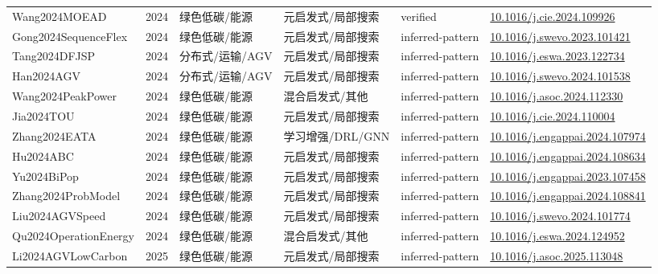 \documentclass[UTF8,a4paper,11pt]{ctexart}
\begin{document}
\begin{landscape}
\begin{longtable}{>{\raggedright\arraybackslash}p{5.0cm}p{0.8cm}>{\raggedright\arraybackslash}p{2.6cm}>{\raggedright\arraybackslash}p{2.8cm}>{\raggedright\arraybackslash}p{2.6cm}>{\raggedright\arraybackslash}p{5.4cm}}
Wang2024MOEAD & 2024 & 绿色低碳/能源 & 元启发式/局部搜索 & verified & \href{https://doi.org/10.1016/j.cie.2024.109926}{10.1016/j.cie.2024.109926} \\
Gong2024SequenceFlex & 2024 & 绿色低碳/能源 & 元启发式/局部搜索 & inferred-pattern & \href{https://doi.org/10.1016/j.swevo.2023.101421}{10.1016/j.swevo.2023.101421} \\
Tang2024DFJSP & 2024 & 分布式/运输/AGV & 元启发式/局部搜索 & inferred-pattern & \href{https://doi.org/10.1016/j.eswa.2023.122734}{10.1016/j.eswa.2023.122734} \\
Han2024AGV & 2024 & 分布式/运输/AGV & 元启发式/局部搜索 & inferred-pattern & \href{https://doi.org/10.1016/j.swevo.2024.101538}{10.1016/j.swevo.2024.101538} \\
Wang2024PeakPower & 2024 & 绿色低碳/能源 & 混合启发式/其他 & inferred-pattern & \href{https://doi.org/10.1016/j.asoc.2024.112330}{10.1016/j.asoc.2024.112330} \\
Jia2024TOU & 2024 & 绿色低碳/能源 & 元启发式/局部搜索 & inferred-pattern & \href{https://doi.org/10.1016/j.cie.2024.110004}{10.1016/j.cie.2024.110004} \\
Zhang2024EATA & 2024 & 绿色低碳/能源 & 学习增强/DRL/GNN & inferred-pattern & \href{https://doi.org/10.1016/j.engappai.2024.107974}{10.1016/j.engappai.2024.107974} \\
Hu2024ABC & 2024 & 绿色低碳/能源 & 元启发式/局部搜索 & inferred-pattern & \href{https://doi.org/10.1016/j.engappai.2024.108634}{10.1016/j.engappai.2024.108634} \\
Yu2024BiPop & 2024 & 绿色低碳/能源 & 元启发式/局部搜索 & inferred-pattern & \href{https://doi.org/10.1016/j.engappai.2023.107458}{10.1016/j.engappai.2023.107458} \\
Zhang2024ProbModel & 2024 & 绿色低碳/能源 & 元启发式/局部搜索 & inferred-pattern & \href{https://doi.org/10.1016/j.engappai.2024.108841}{10.1016/j.engappai.2024.108841} \\
Liu2024AGVSpeed & 2024 & 绿色低碳/能源 & 元启发式/局部搜索 & inferred-pattern & \href{https://doi.org/10.1016/j.swevo.2024.101774}{10.1016/j.swevo.2024.101774} \\
Qu2024OperationEnergy & 2024 & 绿色低碳/能源 & 混合启发式/其他 & inferred-pattern & \href{https://doi.org/10.1016/j.eswa.2024.124952}{10.1016/j.eswa.2024.124952} \\
Li2024AGVLowCarbon & 2025 & 绿色低碳/能源 & 元启发式/局部搜索 & inferred-pattern & \href{https://doi.org/10.1016/j.asoc.2025.113048}{10.1016/j.asoc.2025.113048} \\

\end{longtable}
\end{landscape}
\end{document}
